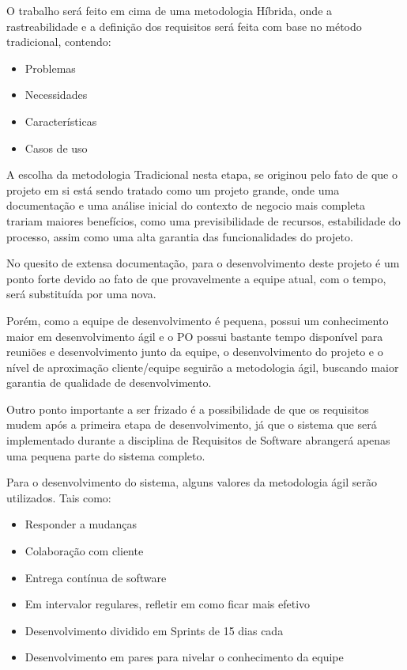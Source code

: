O trabalho será feito em cima de uma metodologia Híbrida, onde a rastreabilidade e a definição dos requisitos será feita com base no método 
tradicional, contendo:

\begin{itemize}
    \item{Problemas}
    \item{Necessidades}
    \item{Características}
    \item{Casos de uso}
\end{itemize}

A escolha da metodologia Tradicional nesta etapa, se originou pelo fato de que o projeto em si está sendo tratado como um projeto grande, onde uma documentação e uma análise inicial do contexto de negocio mais completa trariam maiores benefícios, como uma previsibilidade de recursos, estabilidade do processo, assim como uma alta garantia das funcionalidades do projeto.

No quesito de extensa documentação, para o desenvolvimento deste projeto é um ponto forte devido ao fato de que provavelmente a equipe atual, com o tempo, será substituída por uma nova.

Porém, como a equipe de desenvolvimento é pequena, possui um conhecimento maior em desenvolvimento ágil e o PO possui bastante tempo disponível para reuniões e desenvolvimento junto da equipe, o desenvolvimento do projeto e o nível de aproximação cliente/equipe seguirão a metodologia ágil, buscando maior garantia de qualidade de desenvolvimento.

Outro ponto importante a ser frizado é a possibilidade de que os requisitos mudem após a primeira etapa de desenvolvimento, já que o sistema que será implementado durante a disciplina de Requisitos de Software abrangerá apenas uma pequena parte do sistema completo. 
    
Para o desenvolvimento do sistema, alguns valores da metodologia ágil serão utilizados. Tais como:

\begin{itemize}
    \item{Responder a mudanças}
    \item{Colaboração com cliente}
    \item{Entrega contínua de software}
    \item{Em intervalor regulares, refletir em como ficar mais efetivo}
    \item{Desenvolvimento dividido em Sprints de 15 dias cada}
    \item{Desenvolvimento em pares para nivelar o conhecimento da equipe}
\end{itemize}

